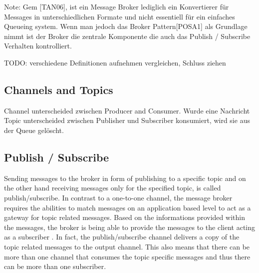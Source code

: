 Note: Gem [TAN06], ist ein Message Broker lediglich ein Konvertierer für
Messages in unterschiedlichen Formate und nicht essentiell für ein einfaches
Queueing system. Wenn man jedoch das Broker Pattern[POSA1] als Grundlage nimmt
ist der Broker die zentrale Komponente die auch das Publish / Subscribe
Verhalten kontrolliert.

TODO: verschiedene Definitionen aufnehmen vergleichen, Schluss ziehen \\

\subsection{Channels and Topics} %
Channel unterscheided zwischen Producer and Consumer. Wurde eine Nachricht
Topic unterscheided zwischen Publisher und Subscriber
konsumiert, wird sie aus der Queue gelöscht.

\subsection{Publish / Subscribe}
Sending messages to the broker in form of publishing to a specific topic and
on the other hand receiving messages only for the specified topic, is called
publish/subscribe.
In contrast to a one-to-one channel, the message broker requires the abilities 
to match messages on an application based level to act as a gateway for topic
related messages. Based on the informations provided within the messages, 
the broker is being able to provide the messages to the client acting as a 
subscriber \cite{TAN06}. In fact, the publish/subscribe channel delivers a copy of the 
topic related messages to the output channel. This also means that there can 
be more than one channel that consumes the topic specific messages and thus there
can be more than one subscriber. \cite{EIP03}


